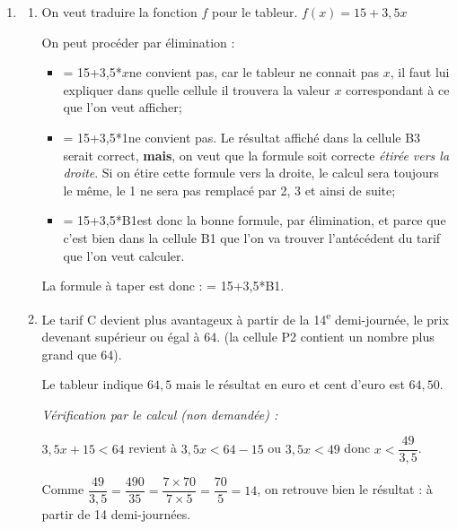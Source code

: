 \documentclass[12pt,a4paper,french]{article}
\providecommand{\up}{\textsuperscript}
\begin{document}
\begin{enumerate}
	\item \begin{enumerate}
		\item On veut traduire la fonction $f$ pour le tableur. \quad $f(x) = 15 + 3,5x$

		On peut procéder par élimination :
		\begin{itemize}
			\item \textsf{= 15+3,5*$x$}\quad ne convient pas, car le tableur ne connait pas $x$, il faut lui expliquer dans quelle cellule il trouvera la valeur $x$ correspondant à ce que l'on veut afficher;
			\item \textsf{= 15+3,5*1}\quad ne convient pas. Le résultat affiché dans la cellule \textsf{B3} serait correct, \textbf{mais}, on veut que la formule soit correcte \emph{étirée vers la droite}. Si on étire cette formule vers la droite, le calcul sera toujours le même, le 1 ne sera pas remplacé par 2, 3 et ainsi de suite;
			\item \textsf{= 15+3,5*B1}\quad est donc la bonne formule, par élimination, et parce que c'est bien dans la cellule \textsf{B1} que l'on va trouver l'antécédent du tarif que l'on veut calculer.
		\end{itemize}

		La formule à taper est donc :\quad\textsf{  = 15+3,5*B1.}

		\item Le tarif C devient plus avantageux à partir de la 14\up{e} demi-journée, le prix devenant supérieur ou égal à 64. (la cellule \textsf{P2} contient un nombre plus grand que 64).

Le tableur indique $64,5$ mais le résultat en euro et cent d'euro est $64,50$.

		\emph{Vérification par le calcul (non demandée) :}

$3,5x + 15 <  64$ \quad revient à \quad $3,5x<  64-15
	$ ou $3,5x <  49$ \quad donc \quad $x < \dfrac{49}{3,5}$.

Comme \quad $\dfrac{49}{3,5} = \dfrac{490}{35} = \dfrac{7\times 70}{7\times 5} = \dfrac{70}{5} = 14$, \quad on retrouve bien le résultat : à partir de 14 demi-journées.
	\end{enumerate}
\end{enumerate}
\end{document}
